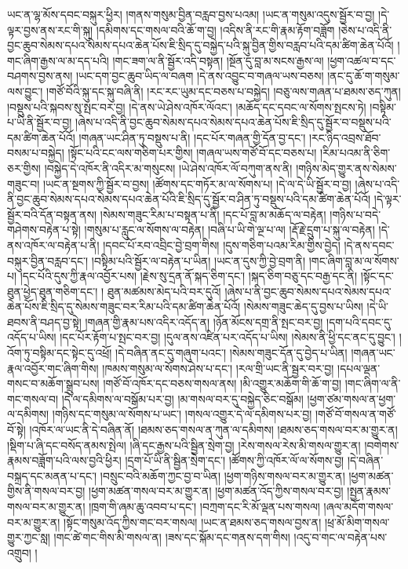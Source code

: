 ཡང་ན་ལྷ་མོས་དབང་བསྐུར་ཕྱིར། །གནས་གསུམ་བྱིན་བརླབ་བྱས་པའམ། །ཡང་ན་གསུམ་འདུས་སྦྱོར་བ་བྱ། །དེ་ལྟར་བྱས་ནས་རང་གི་སྐུ། །དམིགས་དང་གསལ་བའི་ཆོ་ག་བྱ། །འདིས་ནི་རང་གི་རྣམ་རྟོག་བཟློག །ཅེས་པ་འདི་ནི་བྱང་ཆུབ་སེམས་དཔའ་སེམས་དཔའ་ཆེན་པོས་ཇི་སྲིད་དུ་བསྐྱེད་པའི་སྐུ་བྱིན་གྱིས་བརླབ་པའི་དམ་ཚིག་ཆེན་པོའོ། །གང་ཞིག་རྒྱས་ལ་མ་དད་པའི། །གང་ཟག་ལ་ནི་སྦྱོར་འདི་བསྟན། །སྔོན་དུ་བླ་མ་སངས་རྒྱས་ལ། །ཕྱག་འཚལ་བ་དང་བཤགས་བྱས་ནས། །ཡང་དག་བྱང་ཆུབ་ཡིད་ལ་བཞག །དེ་ནས་འབྱུང་བ་གཞལ་ཡས་བཅས། །ནང་དུ་ཆོ་ག་གསུམ་ལས་བྱུང་། །གཙོ་བོའི་སྐུ་དང་སྐུ་བཞི་ནི། །རང་རང་ཡུམ་དང་བཅས་པ་བསྐྱེད། །བཅུ་ལས་གཞན་པ་ཐམས་ཅད་ཀུན། །བསྡུས་པའི་སྐབས་སུ་སྤང་བར་བྱ། །དེ་ནས་ཡེ་ཤེས་འཁོར་ལོའང་། །མཆོད་དང་དབང་ལ་སོགས་སྤངས་ཏེ། །བསྟིམ་པ་ཡི་ནི་སྦྱོར་བ་བྱ། །ཞེས་པ་འདི་ནི་བྱང་ཆུབ་སེམས་དཔའ་སེམས་དཔའ་ཆེན་པོས་ཇི་སྲིད་དུ་སྦྱོར་བ་བསྡུས་པའི་དམ་ཚིག་ཆེན་པོའོ། །གཞན་ཡང་ཤིན་ཏུ་བསྡུས་པ་ནི། །དང་པོར་གཞན་གྱི་དོན་བྱ་དང་། །རང་ཉིད་འབྲས་ཐོབ་བསམ་པ་བསྐྱེད། །སྟོང་པའི་ངང་ལས་གཅིག་པར་གྱིས། །གཞལ་ཡས་གཙོ་བོ་དང་བཅས་པ། །རིམ་པའམ་ནི་ཅིག་ཅར་གྱིས། །བསྐྱེད་དེ་འཁོར་ནི་འདིར་མ་གསུངས། །ཡེ་ཤེས་འཁོར་ལོ་བཀུག་ནས་ནི། །གཉིས་མེད་གྱུར་ནས་སེམས་གཟུང་བ། །ཡང་ན་སྔགས་ཀྱི་སྦྱོར་བ་བྱས། །ཚོགས་དང་གཏོར་མ་ལ་སོགས་པ། །དེ་ལ་དེ་ཡི་སྦྱོར་བ་བྱ། །ཞེས་པ་འདི་ནི་བྱང་ཆུབ་སེམས་དཔའ་སེམས་དཔའ་ཆེན་པོའི་ཇི་སྲིད་དུ་སྦྱོར་བ་ཤིན་ཏུ་བསྡུས་པའི་དམ་ཚིག་ཆེན་པོའོ། །དེ་ལྟར་སྦྱོར་བའི་དོན་བསྟན་ནས། །སེམས་གཟུང་རིམ་པ་བསྟན་པ་ནི། །དང་པོ་བླ་མ་མཆོད་ལ་བརྟེན། །གཉིས་པ་བདེ་གཤེགས་བརྟེན་པ་སྟེ། །གསུམ་པ་རླུང་ལ་སོགས་ལ་བརྟེན། །བཞི་པ་ཡི་གེ་ལྔ་པ་ལ། །རྡོ་རྗེ་དྲུག་པ་སྐུ་ལ་བརྟེན། །དེ་ནས་འཁོར་ལ་བརྟེན་པ་ནི། །དབང་པོ་རབ་འབྲིང་བྱེ་བྲག་གིས། །དུས་གཅིག་པའམ་རིམ་གྱིས་བྱེད། །དེ་ནས་དབང་བསྐུར་བྱིན་བརླབ་དང་། །བསྟིམ་པའི་སྦྱོར་ལ་བརྟེན་པ་ཡིན། །ཡང་ན་དུས་ཀྱི་བྱེ་བྲག་ནི། །གང་ཞིག་བླ་མ་ལ་སོགས་པ། །དང་པོའི་དུས་ཀྱི་རྣལ་འབྱོར་པས། །རྗེས་སུ་དྲན་ནོ་སྐད་ཅིག་དང་། །སྐད་ཅིག་བཅུ་དང་བརྒྱ་དང་ནི། །སྟོང་དང་ཐུན་ཕྱེད་ཐུན་གཅིག་དང་། །
ཐུན་མཚམས་མེད་པའི་བར་དུའོ། །ཞེས་པ་ནི་བྱང་ཆུབ་སེམས་དཔའ་སེམས་དཔའ་ཆེན་པོས་ཇི་སྲིད་དུ་སེམས་གཟུང་བར་རིམ་པའི་དམ་ཚིག་ཆེན་པོའོ། །སེམས་གཟུང་ཆེད་དུ་བྱས་པ་ཡིས། །དེ་ཡི་ཐབས་ནི་བཤད་བྱ་སྟེ། །གཞན་གྱི་རྣམ་པས་འདིར་འདོད་ན། །ཉོན་མོངས་དགྲ་ནི་སྤང་བར་བྱ། །དག་པའི་དབང་དུ་འདོད་པ་ཡིས། །དང་པོར་རྟོག་པ་སྤང་བར་བྱ། །དུལ་ནས་འཛིན་པར་འདོད་པ་ཡིས། །སེམས་ནི་ཕྱི་དང་ནང་དུ་བྱུང་། །འོག་ཏུ་བསྟིམ་དང་སྟེང་དུ་འཕྲོ། །དེ་བཞིན་ནང་དུ་གཞུག་པའང་། །སེམས་གཟུང་དོན་དུ་བྱེད་པ་ཡིན། །གཞན་ཡང་རྣལ་འབྱོར་གང་ཞིག་གིས། །ཁམས་གསུམ་ལ་སོགས་ཤེས་པ་དང་། །རལ་གྲི་ཡང་ནི་སྦྱར་བར་བྱ། །དཔལ་ལྡན་གསང་བ་མཆོག་སྒྲུབ་པས། །གཙོ་བོ་འཁོར་དང་བཅས་གསལ་ནས། །མི་འགྱུར་མཆོག་གི་ཆོ་ག་བྱ། །གང་ཞིག་ལ་ནི་གང་གསལ་བ། །དེ་ལ་དམིགས་ལ་བསྒོམ་པར་བྱ། །མ་གསལ་བར་དུ་བསྐྱེད་ཅིང་བསྒོམ། །ཕྱག་ཙམ་གསལ་ན་ཕྱག་ལ་དམིགས། །གཉིས་དང་གསུམ་ལ་སོགས་པ་ཡང་། །གསལ་འགྱུར་དེ་ལ་དམིགས་པར་བྱ། །གཙོ་བོ་གསལ་ན་གཙོ་བོ་སྟེ། །འཁོར་ལ་ཡང་ནི་དེ་བཞིན་ནོ། །ཐམས་ཅད་གསལ་ན་ཀུན་ལ་དམིགས། །ཐམས་ཅད་གསལ་བར་མ་གྱུར་ན། །སྡིག་པ་ཞི་དང་བསོད་ནམས་སྤེལ། །ཞི་དང་རྒྱས་པའི་སྦྱིན་སྲེག་བྱ། །རེས་གསལ་རེས་མི་གསལ་གྱུར་ན། །བགེགས་རྣམས་བཟློག་པའི་ལས་བྱའི་ཕྱིར། །དྲག་པོ་ཡི་ནི་སྦྱིན་སྲེག་དང་། །ཚོགས་ཀྱི་འཁོར་ལོ་ལ་སོགས་བྱ། །དེ་བཞིན་བསྐྲད་དང་མནན་པ་དང་། །བསྲུང་བའི་མཆོག་ཀྱང་བྱ་བ་ཡིན། །ཕྱག་གཉིས་གསལ་བར་མ་གྱུར་ན། །ཕྱག་མཚན་གྱིས་ནི་གསལ་བར་བྱ། །ཕྱག་མཚན་གསལ་བར་མ་གྱུར་ན། །ཕྱག་མཚན་འོད་ཀྱིས་གསལ་བར་བྱ། །སྤྱན་རྣམས་གསལ་བར་མ་གྱུར་ན། །ཁྲག་གི་ཞམ་ཆུ་འབབ་པ་དང་། །བཀྲག་དང་རི་མོ་ལྡན་པས་གསལ། །ཞལ་མདོག་གསལ་བར་མ་གྱུར་ན། །སྟོང་གསུམ་འོད་ཀྱིས་གང་བར་གསལ། །ཡང་ན་ཐམས་ཅད་གསལ་བྱས་ན། །ཕྲ་མོ་མིག་གསལ་གྱུར་ཀྱང་སླ། །གང་ཚེ་གང་གིས་མི་གསལ་ན། །ཟས་དང་སྐོམ་དང་གནས་དག་གིས། །འདུ་བ་གང་ལ་བརྟེན་པས་འགྲུབ། །
